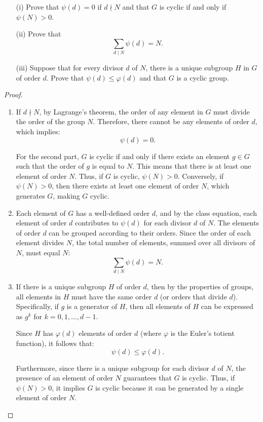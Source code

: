 \documentclass{article}
\begin{document}
\begin{enumerate}
    \item[(i)] Prove that \( \psi(d) = 0 \) if \( d \nmid N \) and that \( G \) is cyclic if and only if \( \psi(N) > 0 \).
    
    \item[(ii)] Prove that 
    \[
    \sum_{d \mid N} \psi(d) = N.
    \]

    \item[(iii)] Suppose that for every divisor \( d \) of \( N \), there is a unique subgroup \( H \) in \( G \) of order \( d \). Prove that \( \psi(d) \leq \varphi(d) \) and that \( G \) is a cyclic group.
\end{enumerate}
\begin{proof}
    \begin{enumerate}
        \item If \( d \nmid N \), by Lagrange's theorem, the order of any element in \( G \) must divide the order of the group \( N \). Therefore, there cannot be any elements of order \( d \), which implies:
        \[
        \psi(d) = 0.
        \]
    
        For the second part, \( G \) is cyclic if and only if there exists an element \( g \in G \) such that the order of \( g \) is equal to \( N \). This means that there is at least one element of order \( N \). Thus, if \( G \) is cyclic, \( \psi(N) > 0 \). Conversely, if \( \psi(N) > 0 \), then there exists at least one element of order \( N \), which generates \( G \), making \( G \) cyclic.

        \item Each element of \( G \) has a well-defined order \( d \), and by the class equation, each element of order \( d \) contributes to \( \psi(d) \) for each divisor \( d \) of \( N \). The elements of order \( d \) can be grouped according to their orders. Since the order of each element divides \( N \), the total number of elements, summed over all divisors of \( N \), must equal \( N \):
        \[
        \sum_{d \mid N} \psi(d) = N.
        \]
\item      If there is a unique subgroup \( H \) of order \( d \), then by the properties of groups, all elements in \( H \) must have the same order \( d \) (or orders that divide \( d \)). Specifically, if \( g \) is a generator of \( H \), then all elements of \( H \) can be expressed as \( g^k \) for \( k = 0, 1, \ldots, d-1 \). 

Since \( H \) has \( \varphi(d) \) elements of order \( d \) (where \( \varphi \) is the Euler's totient function), it follows that:
\[
\psi(d) \leq \varphi(d).
\]

Furthermore, since there is a unique subgroup for each divisor \( d \) of \( N \), the presence of an element of order \( N \) guarantees that \( G \) is cyclic. Thus, if \( \psi(N) > 0 \), it implies \( G \) is cyclic because it can be generated by a single element of order \( N \).

    \end{enumerate}
\end{proof}
\end{document}
